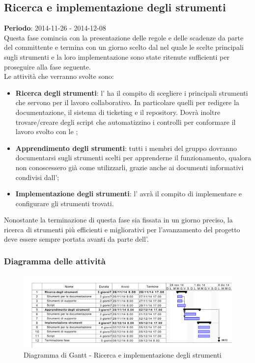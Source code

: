 	\subsection{Ricerca e implementazione degli strumenti} %
	\label{sub:ricerca_e_implementazione_degli_strumenti}
	\textbf{Periodo}: 2014-11-26 - 2014-12-08 \\
	Questa fase comincia con la presentazione delle regole e delle scadenze da parte del committente e termina con un giorno scelto dal \roleProjectManager{} nel quale le scelte principali sugli strumenti e la loro implementazione sono state ritenute sufficienti per proseguire alla fase seguente. \\
	Le attività che verranno svolte sono:
		\begin{itemize}
			\item \textbf{Ricerca degli strumenti}: l'\roleAdministrator{} ha il compito di scegliere i principali strumenti che servono per il lavoro collaborativo. In particolare quelli per redigere la documentazione, il sistema di ticketing e il repository. Dovrà inoltre trovare/creare degli script che automatizzino i controlli per conformare il lavoro svolto con le \docNameVersionNdP;
			\item \textbf{Apprendimento degli strumenti}: tutti i membri del gruppo dovranno documentarsi sugli strumenti scelti per apprenderne il funzionamento, qualora non conoscessero già come utilizzarli, grazie anche ai documenti informativi condivisi dall'\roleAdministrator;
			\item \textbf{Implementazione degli strumenti}: l'\roleAdministrator{} avrà il compito di implementare e configurare gli strumenti trovati.
		\end{itemize}
	\noindent
	Nonostante la terminazione di questa fase sia fissata in un giorno preciso, la ricerca di strumenti più efficienti e migliorativi per l'avanzamento del progetto deve essere sempre portata avanti da parte dell'\roleAdministrator.
	 	
		\subsubsection{Diagramma delle attività} %
		\label{ssub:diagramma_delle_attivita}
			\begin{figure}[htbp]
				\centerline{\includegraphics[scale=0.7]{images/d_attivita_fase_implem_strumenti.pdf}}
				\caption{Diagramma di Gantt - Ricerca e implementazione degli strumenti}
				\label{fig:gantt_ricerca_e_implementazione_strumenti}				
			\end{figure}
	
